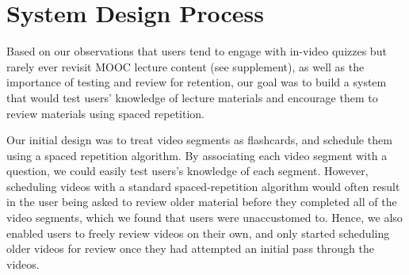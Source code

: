 \documentclass{sigchi}
\begin{document}




\pagebreak

\section{System Design Process}

Based on our observations that users tend to engage with in-video quizzes but rarely ever revisit MOOC lecture content (see supplement), as well as the importance of testing and review for retention, our goal was to build a system that would test users' knowledge of lecture materials and encourage them to review materials using spaced repetition.


Our initial design was to treat video segments as flashcards, and schedule them using a spaced repetition algorithm. By associating each video segment with a question, we could easily test users's knowledge of each segment. However, scheduling videos with a standard spaced-repetition algorithm would often result in the user being asked to review older material before they completed all of the video segments, which we found that users were unaccustomed to. Hence, we also enabled users to freely review videos on their own, and only started scheduling older videos for review once they had attempted an initial pass through the videos. %
\end{document}
